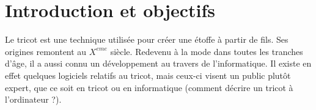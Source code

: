 \documentclass{article}
\begin{document}


\newpage

%




\tableofcontents

\newpage

\section{Introduction et objectifs}

Le tricot est une technique utilisée pour créer une étoffe à partir de fils. Ses origines remontent au $X^{eme}$ siècle.
Redevenu à la mode dans toutes les tranches d'âge, il a aussi connu un développement au travers de l'informatique. Il existe en effet
quelques logiciels relatifs au tricot, mais ceux-ci visent un public plutôt expert, que ce soit en tricot ou en informatique (comment
décrire un tricot à l'ordinateur ?).
\end{document}
